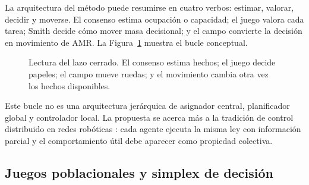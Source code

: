 La arquitectura del método puede resumirse en cuatro verbos: estimar, valorar, decidir
y moverse. El consenso estima ocupación o capacidad; el juego valora cada tarea; Smith
decide cómo mover masa decisional; y el campo convierte la decisión en movimiento de
AMR. La Figura~\ref{fig:marco_capas} muestra el bucle conceptual.

\begin{figure}[H]
\centering
{}
\caption{Lectura del lazo cerrado. El consenso estima hechos; el juego decide papeles;
el campo mueve ruedas; y el movimiento cambia otra vez los hechos disponibles.}
\label{fig:marco_capas}
\end{figure}

Este bucle no es una arquitectura jerárquica de asignador central, planificador global y
controlador local. La propuesta se acerca más a la tradición de control distribuido en
redes robóticas \citep{bullo2009distributed,ren2008distributed}: cada agente ejecuta la
misma ley con información parcial y el comportamiento útil debe aparecer como propiedad
colectiva.

\subsection{Juegos poblacionales y simplex de decisión}

